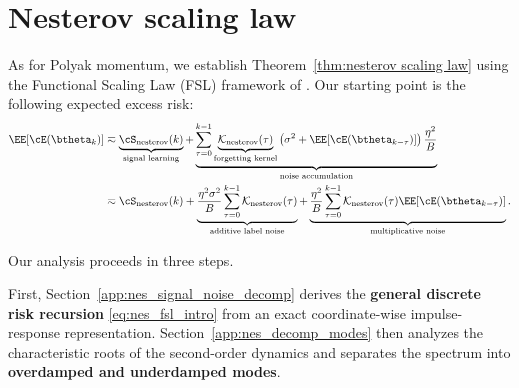 \documentclass[11pt]{article}
\newcommand{\nesterov}{\mathrm{nesterov}}
\begin{document}

\section{Nesterov scaling law}
\label{app:nesterov scaling law}




As for Polyak momentum, we establish Theorem~\ref{thm:nesterov scaling law} using the Functional Scaling Law (FSL) framework of \citet{li2026functional}. Our starting point is the following expected excess risk:
\begin{align}
    \EE[\cE(\btheta_k)] 
    &\eqsim \underbrace{\cS_{\nesterov}(k)}_{\text{signal learning}} +\underbrace{\sum_{\tau=0}^{k-1}\underbrace{\mathcal{K}_{\nesterov}(\tau)}_{\text{forgetting kernel}} \left(\sigma^2 + \EE[\cE(\btheta_{k-\tau})]\right) \frac{\eta^2}{B}}_{\text{noise accumulation}} \label{eq:nes_fsl_intro_org}\\
    &\eqsim \cS_{\nesterov}(k) + \underbrace{\frac{\eta^2\sigma^2}{B}\sum_{\tau=0}^{k-1}\mathcal{K}_{\nesterov}(\tau)}_{\text{additive label noise}} + \underbrace{\frac{\eta^2}{B}\sum_{\tau=0}^{k-1}\mathcal{K}_{\nesterov}(\tau)\EE[\cE(\btheta_{k-\tau})]}_{\text{multiplicative noise}}. \label{eq:nes_fsl_intro}
\end{align}

Our analysis proceeds in three steps.

First, Section~\ref{app:nes_signal_noise_decomp} derives the \textbf{general discrete risk recursion} \eqref{eq:nes_fsl_intro} from an exact coordinate-wise impulse-response representation. Section~\ref{app:nes_decomp_modes} then analyzes the characteristic roots of the second-order dynamics and separates the spectrum into \textbf{overdamped and underdamped modes}.
\end{document}
